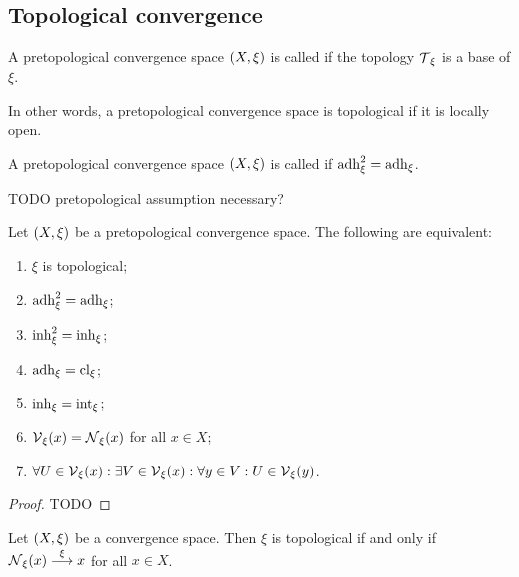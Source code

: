 \subsection{Topological convergence}
\begin{definition}
A pretopological convergence space $\sSet{X,\xi}$ is called  if the topology $\operatorname{\mathcal{T}}_\xi$ is a base of $\xi$.
\end{definition}
In other words, a pretopological convergence space is topological if it is locally open.

\begin{definition}
A pretopological convergence space $\sSet{X,\xi}$ is called  if $\operatorname{adh}_\xi^2 = \operatorname{adh}_\xi$.
\end{definition}
TODO pretopological assumption necessary?

\begin{proposition} \label{pretopologicalSpaceTopological}
Let $\sSet{X,\xi}$ be a pretopological convergence space. The following are equivalent:
\begin{enumerate}
\item $\xi$ is topological;
\item $\operatorname{adh}_\xi^2 = \operatorname{adh}_\xi$;
\item $\operatorname{inh}_\xi^2 = \operatorname{inh}_\xi$;
\item $\operatorname{adh}_\xi = \operatorname{cl}_\xi$;
\item $\operatorname{inh}_\xi = \operatorname{int}_\xi$;
\item $\operatorname{\mathcal{V}}_\xi(x) = \operatorname{\mathcal{N}}_\xi(x)$ for all $x\in X$;
\item $\forall U\in \operatorname{\mathcal{V}}_\xi(x): \exists V\in \operatorname{\mathcal{V}}_\xi(x): \forall y\in V: U\in\operatorname{\mathcal{V}}_\xi(y)$.
\end{enumerate}
\end{proposition}
\begin{proof}
TODO
\end{proof}
\begin{corollary}
Let $\sSet{X,\xi}$ be a convergence space. Then $\xi$ is topological \textup{if and only if} $\operatorname{\mathcal{N}}_\xi(x) \overset{\xi}{\longrightarrow} x$ for all $x\in X$.
\end{corollary}

